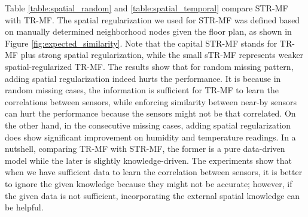 Table \ref{table:spatial_random} and \ref{table:spatial_temporal} compare STR-MF with TR-MF. The spatial regularization we used for STR-MF was defined based on manually determined neighborhood nodes given the floor plan, as shown in Figure \ref{fig:expected_similarity}.
Note that the capital STR-MF stands for TR-MF plus strong spatial regularization, while the small sTR-MF represents weaker spatial-regularized TR-MF. The results show that for random missing pattern, adding spatial regularization indeed hurts the performance. It is because in random missing cases, the information is sufficient for TR-MF to learn the correlations between sensors, while enforcing similarity between near-by sensors can hurt the performance because the sensors might not be that correlated. On the other hand, in the consecutive missing cases, adding spatial regularization does show significant improvement on humidity and temperature readings. In a nutshell, comparing TR-MF with STR-MF, the former is a pure data-driven model while the later is slightly knowledge-driven. The experiments show that when we have sufficient data to learn the correlation between sensors, it is better to ignore the given knowledge because they might not be accurate; however, if the given data is not sufficient, incorporating the external spatial knowledge can be helpful.


